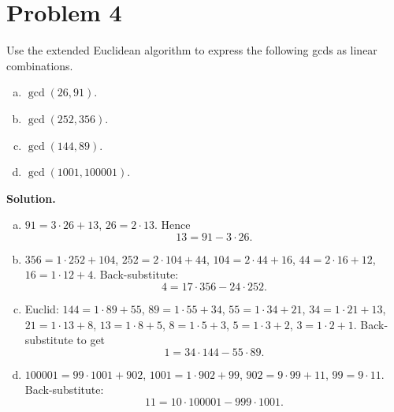 \section*{Problem 4}

Use the extended Euclidean algorithm to express the following gcds as linear combinations.

\begin{enumerate}[(a)]
\item $\gcd(26,91)$.
\item $\gcd(252,356)$.
\item $\gcd(144,89)$.
\item $\gcd(1001,100001)$.
\end{enumerate}

\textbf{Solution.}

\begin{enumerate}[(a)]
\item $91=3\cdot 26+13$, $26=2\cdot 13$. Hence
\[
13=91-3\cdot 26.
\]

\item $356=1\cdot 252+104$, $252=2\cdot 104+44$, $104=2\cdot 44+16$, $44=2\cdot 16+12$, $16=1\cdot 12+4$.
Back-substitute:
\[
4=17\cdot 356-24\cdot 252.
\]

\item Euclid: $144=1\cdot 89+55$, $89=1\cdot 55+34$, $55=1\cdot 34+21$, $34=1\cdot 21+13$, $21=1\cdot 13+8$,
$13=1\cdot 8+5$, $8=1\cdot 5+3$, $5=1\cdot 3+2$, $3=1\cdot 2+1$.
Back-substitute to get
\[
1=34\cdot 144-55\cdot 89.
\]

\item $100001=99\cdot 1001+902$, $1001=1\cdot 902+99$, $902=9\cdot 99+11$, $99=9\cdot 11$.
Back-substitute:
\[
11=10\cdot 100001-999\cdot 1001.
\]
\end{enumerate}
